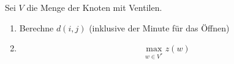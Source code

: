 \documentclass{article}
\begin{document}
Sei $V$ die Menge der Knoten mit Ventilen. 

\begin{enumerate}
\item Berechne $d(i,j)$ (inklusive der Minute für das Öffnen)
\item 
\[
 \max _{w \in V^*} z(w)
\]
\end{enumerate}
\end{document}
